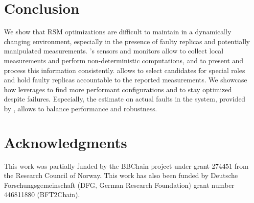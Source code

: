 \section{Conclusion}

We show that RSM optimizations are difficult to maintain in a dynamically changing environment, especially in the presence of faulty replicas and potentially manipulated measurements.
\sysname's sensors and monitors allow to collect local measurements and perform non-deterministic computations, and to present and process this information consistently. 
\sysname allows to select candidates for special roles and hold faulty replicas accountable to the reported measurements.
We showcase how \optitree leverages \sysname to find more performant configurations and to stay optimized despite failures. 
Especially, the estimate on actual faults in the system, provided by \sysname, allows \optitree to balance performance and robustness.


\section{Acknowledgments}
This work was partially funded by the BBChain project under grant 274451 from the Research Council of Norway. This work has also
been funded by Deutsche Forschungsgemeinschaft (DFG, German Research Foundation) grant number 446811880 (BFT2Chain).
